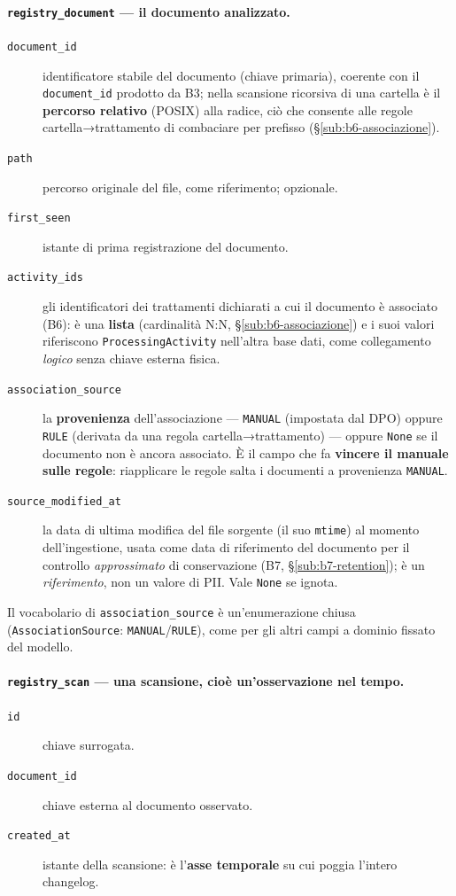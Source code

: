 \paragraph{\texttt{registry\_document} --- il documento analizzato.}
\begin{description}
	\item[\texttt{document\_id}] identificatore stabile del documento (chiave primaria), coerente con il \texttt{document\_id} prodotto da B3; nella scansione ricorsiva di una cartella è il \textbf{percorso relativo} (POSIX) alla radice, ciò che consente alle regole cartella→trattamento di combaciare per prefisso (§\ref{sub:b6-associazione}).
	\item[\texttt{path}] percorso originale del file, come riferimento; opzionale.
	\item[\texttt{first\_seen}] istante di prima registrazione del documento.
	\item[\texttt{activity\_ids}] gli identificatori dei trattamenti dichiarati a cui il documento è associato (B6): è una \textbf{lista} (cardinalità N:N, §\ref{sub:b6-associazione}) e i suoi valori riferiscono \texttt{ProcessingActivity} nell'altra base dati, come collegamento \emph{logico} senza chiave esterna fisica.
	\item[\texttt{association\_source}] la \textbf{provenienza} dell'associazione --- \texttt{MANUAL} (impostata dal DPO) oppure \texttt{RULE} (derivata da una regola cartella→trattamento) --- oppure \texttt{None} se il documento non è ancora associato. È il campo che fa \textbf{vincere il manuale sulle regole}: riapplicare le regole salta i documenti a provenienza \texttt{MANUAL}.
	\item[\texttt{source\_modified\_at}] la data di ultima modifica del file sorgente (il suo \texttt{mtime}) al momento dell'ingestione, usata come data di riferimento del documento per il controllo \emph{approssimato} di conservazione (B7, §\ref{sub:b7-retention}); è un \emph{riferimento}, non un valore di PII. Vale \texttt{None} se ignota.
\end{description}
Il vocabolario di \texttt{association\_source} è un'enumerazione chiusa (\texttt{AssociationSource}: \texttt{MANUAL}/\texttt{RULE}), come per gli altri campi a dominio fissato del modello.

\paragraph{\texttt{registry\_scan} --- una scansione, cioè un'osservazione nel tempo.}
\begin{description}
	\item[\texttt{id}] chiave surrogata.
	\item[\texttt{document\_id}] chiave esterna al documento osservato.
	\item[\texttt{created\_at}] istante della scansione: è l'\textbf{asse temporale} su cui poggia l'intero changelog.
\end{description}

